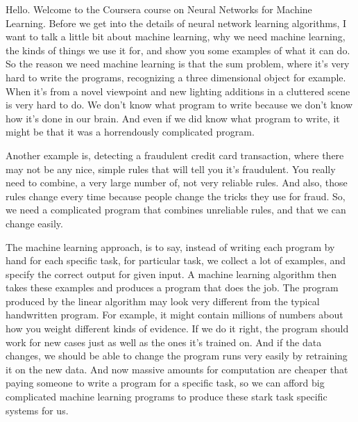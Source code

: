 \begin{multicols}{2}
\begin{footnotesize}
Hello. Welcome to the Coursera course on Neural Networks for Machine Learning. Before we get into the details of neural network learning algorithms, I want to talk a little bit about machine learning, why we need machine learning, the kinds of things we use it for, and show you some examples of what it can do. So the reason we need machine learning is that the sum problem, where it's very hard to write the programs, recognizing a three dimensional object for example. When it's from a novel viewpoint and new lighting additions in a cluttered scene is very hard to do. We don't know what program to write because we don't know how it's done in our brain. And even if we did know what program to write, it might be that it was a horrendously complicated program. 

Another example is, detecting a fraudulent credit card transaction, where there may not be any nice, simple rules that will tell you it's fraudulent. You really need to combine, a very large number of, not very reliable rules. And also, those rules change every time because people change the tricks they use for fraud. So, we need a complicated program that combines unreliable rules, and that we can change easily. 

The machine learning approach, is to say, instead of writing each program by hand for each specific task, for particular task, we collect a lot of examples, and specify the correct output for given input. A machine learning algorithm then takes these examples and produces a program that does the job. The program produced by the linear algorithm may look very different from the typical handwritten program. For example, it might contain millions of numbers about how you weight different kinds of evidence. If we do it right, the program should work for new cases just as well as the ones it's trained on. And if the data changes, we should be able to change the program runs very easily by retraining it on the new data. And now massive amounts for computation are cheaper that paying someone to write a program for a specific task, so we can afford big complicated machine learning programs to produce these stark task specific systems for us.


\end{footnotesize}
\end{multicols}
